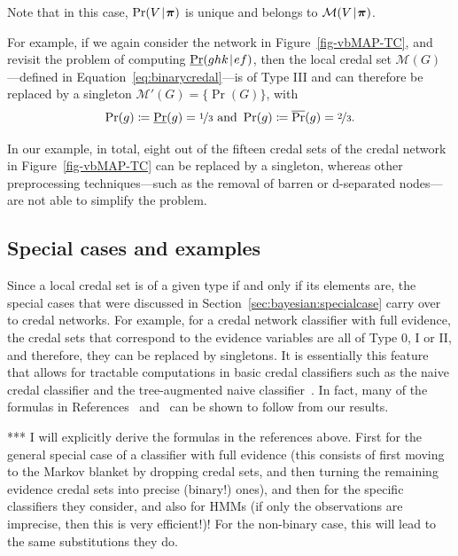 \documentclass[10pt,a4paper]{paper}
\theoremstyle{definition}
\newcommand{\vbpi}{\boldsymbol\pi}
\newcommand{\credal}{\mathcal{M}}
\newcommand{\newmid}{\hspace{0.9pt}\vert\hspace{0.9pt}}
\begin{document}
\bigskip

\noindent
Note that in this case, $\Pr(V\newmid\vbpi)$ is unique and belongs to $\credal(V\newmid \vbpi)$.

For example, if we again consider the network in Figure~\ref{fig-vbMAP-TC}, and revisit the problem of computing $\underline{\Pr}(ghk\newmid ef)$, then the local credal set $\credal(G)$---defined in Equation~\eqref{eq:binarycredal}---is of Type III and can therefore be replaced by a singleton $\credal'(G)=\{\Pr(G)\}$, with
\begin{equation*}
\Pr(g)\coloneqq\underline{\Pr}(g)=\nicefrac{1}{3}
\text{ and }\Pr(g)\coloneqq\overline{\Pr}(g)=\nicefrac{2}{3}.
\end{equation*}

In our example, in total, eight out of the fifteen credal sets of the credal network in Figure~\ref{fig-vbMAP-TC} can be replaced by a singleton, whereas other preprocessing techniques---such as the removal of barren or d-separated nodes---are not able to simplify the problem.


\subsection{Special cases and examples}\label{sec:credal:specialcase}

Since a local credal set is of a given type if and only if its elements are, the special cases that were discussed in Section~\ref{sec:bayesian:specialcase} carry over to credal networks. For example, for a credal network classifier with full evidence, the credal sets that correspond to the evidence variables are all of Type 0, I or II, and therefore, they can be replaced by singletons. It is essentially this feature that allows for tractable computations in basic credal classifiers such as the naive credal classifier \cite{Zaffalon:2002bn} and the tree-augmented naive classifier~\cite{Zaffalon:2003gq}. In fact, many of the formulas in References~\cite{Zaffalon:2002bn} and~\cite{Zaffalon:2003gq} can be shown to follow from our results.

{\color{red} *** I will explicitly derive the formulas in the references above. First for the general special case of a classifier with full evidence (this consists of first moving to the Markov blanket by dropping credal sets, and then turning the remaining evidence credal sets into precise (binary!) ones), and then for the specific classifiers they consider, and also for HMMs (if only the observations are imprecise, then this is very efficient!)! For the non-binary case, this will lead to the same substitutions they do.}
\end{document}
